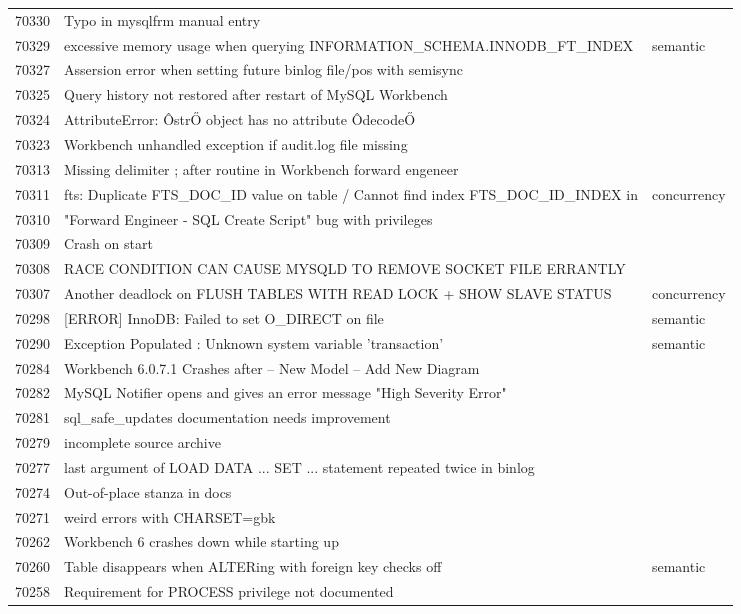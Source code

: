 \begin{longtable}[c]{p{1cm}p{10cm}p{1cm}}
70330 & Typo in mysqlfrm manual entry &  \\
70329 & excessive memory usage when querying INFORMATION\_SCHEMA.INNODB\_FT\_INDEX & semantic \\
70327 & Assersion error when setting future binlog file/pos with semisync &  \\
70325 & Query history not restored after restart of MySQL Workbench &  \\
70324 & AttributeError: ÔstrŐ object has no attribute ÔdecodeŐ &  \\
70323 & Workbench unhandled exception if audit.log file missing &  \\
70313 & Missing delimiter ; after routine in Workbench forward engeneer &  \\
70311 & fts: Duplicate FTS\_DOC\_ID value on table / Cannot find index FTS\_DOC\_ID\_INDEX in & concurrency \\
70310 & "Forward Engineer - SQL Create Script" bug with privileges &  \\
70309 & Crash on start &  \\
70308 & RACE CONDITION CAN CAUSE MYSQLD TO REMOVE SOCKET FILE ERRANTLY &  \\
70307 & Another deadlock on FLUSH TABLES WITH READ LOCK + SHOW SLAVE STATUS & concurrency \\
70298 & {[}ERROR{]} InnoDB: Failed to set O\_DIRECT on file & semantic \\
70290 & Exception Populated : Unknown system variable 'transaction' & semantic \\
70284 & Workbench 6.0.7.1 Crashes after -- New Model -- Add New Diagram &  \\
70282 & MySQL Notifier opens and gives an error message "High Severity Error" &  \\
70281 & sql\_safe\_updates documentation needs improvement &  \\
70279 & incomplete source archive &  \\
70277 & last argument of LOAD DATA ... SET ... statement repeated twice in binlog &  \\
70274 & Out-of-place stanza in docs &  \\
70271 & weird errors with CHARSET=gbk &  \\
70262 & Workbench 6 crashes down while starting up &  \\
70260 & Table disappears when ALTERing with foreign key checks off & semantic \\
70258 & Requirement for PROCESS privilege not documented &  \\

\end{longtable}
